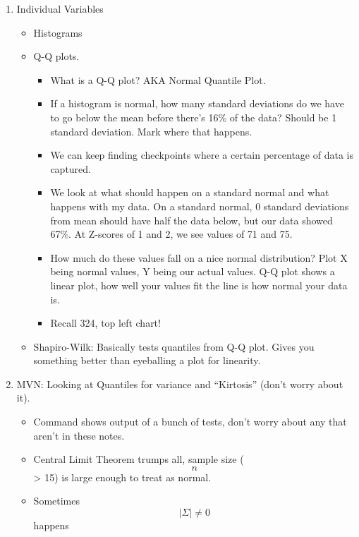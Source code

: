 \documentclass[]{article}
\providecommand{\tightlist}{%
  \setlength{\itemsep}{0pt}\setlength{\parskip}{0pt}}
\begin{document}
\begin{enumerate}
\def\labelenumi{\arabic{enumi}.}
\item
  Individual Variables

  \begin{itemize}
  \tightlist
  \item
    Histograms
  \item
    Q-Q plots.

    \begin{itemize}
    \tightlist
    \item
      What is a Q-Q plot? AKA Normal Quantile Plot.
    \item
      If a histogram is normal, how many standard deviations do we have
      to go below the mean before there's 16\% of the data? Should be 1
      standard deviation. Mark where that happens.
    \item
      We can keep finding checkpoints where a certain percentage of data
      is captured.
    \item
      We look at what should happen on a standard normal and what
      happens with my data. On a standard normal, 0 standard deviations
      from mean should have half the data below, but our data showed
      67\%. At Z-scores of 1 and 2, we see values of 71 and 75.
    \item
      How much do these values fall on a nice normal distribution? Plot
      X being normal values, Y being our actual values. Q-Q plot shows a
      linear plot, how well your values fit the line is how normal your
      data is.
    \item
      Recall 324, top left chart!
    \end{itemize}
  \item
    Shapiro-Wilk: Basically tests quantiles from Q-Q plot. Gives you
    something better than eyeballing a plot for linearity.
  \end{itemize}
\item
  MVN: Looking at Quantiles for variance and ``Kirtosis'' (don't worry
  about it).

  \begin{itemize}
  \tightlist
  \item
    Command shows output of a bunch of tests, don't worry about any that
    aren't in these notes.
  \item
    Central Limit Theorem trumps all, sample size (\[n\] \textgreater{}
    15) is large enough to treat as normal.
  \item
    Sometimes \[|\Sigma| \ne 0\] happens
  \end{itemize}
\end{enumerate}
\end{document}
